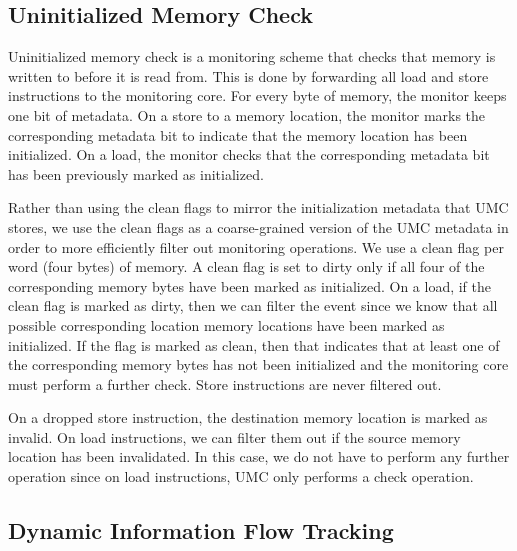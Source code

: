 \subsection{Uninitialized Memory Check}

Uninitialized memory check is a monitoring scheme that checks that memory is
written to before it is read from. This is done by forwarding all load and
store instructions to the monitoring core. For every byte of memory, the
monitor keeps one bit of metadata. On a store to a memory location, the monitor
marks the corresponding metadata bit to indicate that the memory location has
been initialized. On a load, the monitor checks that the corresponding metadata
bit has been previously marked as initialized.

Rather than using the clean flags to mirror the initialization metadata that
UMC stores, we use the clean flags as a coarse-grained version of the UMC
metadata in order to more efficiently filter out monitoring operations. We use
a clean flag per word (four bytes) of memory. A clean flag is set to dirty only
if all four of the corresponding memory bytes have been marked as initialized.
On a load, if the clean flag is marked as dirty, then we can filter the event
since we know that all possible corresponding location memory locations have
been marked as initialized. If the flag is marked as clean, then that indicates
that at least one of the corresponding memory bytes has not been initialized
and the monitoring core must perform a further check. Store instructions are
never filtered out.

On a dropped store instruction, the destination memory location is marked as
invalid. On load instructions, we can filter them out if the source memory
location has been invalidated. In this case, we do not have to perform any
further operation since on load instructions, UMC only performs a check
operation.

\subsection{Dynamic Information Flow Tracking}

